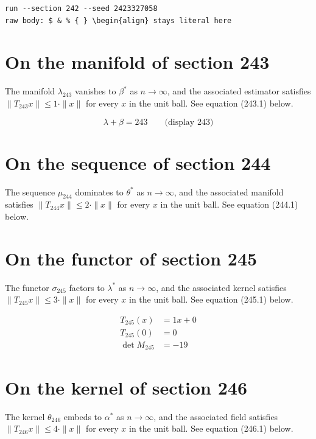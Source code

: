 \documentclass{article}
\begin{document}
\begin{verbatim}
run --section 242 --seed 2423327058
raw body: $ & % { } \begin{align} stays literal here
\end{verbatim}

\section{On the manifold of section 243}
The manifold $\lambda_{243}$ vanishes to $\beta^{*}$ as $n \to \infty$,
and the associated estimator satisfies $\|T_{243} x\| \leq 1 \cdot \|x\|$
for every $x$ in the unit ball. See equation (243.1) below.

$$
\lambda + \beta = 243 \qquad \text{(display 243)}
$$

\section{On the sequence of section 244}
The sequence $\mu_{244}$ dominates to $\theta^{*}$ as $n \to \infty$,
and the associated manifold satisfies $\|T_{244} x\| \leq 2 \cdot \|x\|$
for every $x$ in the unit ball. See equation (244.1) below.

\section{On the functor of section 245}
The functor $\sigma_{245}$ factors to $\lambda^{*}$ as $n \to \infty$,
and the associated kernel satisfies $\|T_{245} x\| \leq 3 \cdot \|x\|$
for every $x$ in the unit ball. See equation (245.1) below.

\begin{align}
T_{245}(x) &= 1 x + 0 \\
T_{245}(0) &= 0 \\
\det M_{245} &= -19
\end{align}

\section{On the kernel of section 246}
The kernel $\theta_{246}$ embeds to $\alpha^{*}$ as $n \to \infty$,
and the associated field satisfies $\|T_{246} x\| \leq 4 \cdot \|x\|$
for every $x$ in the unit ball. See equation (246.1) below.
\end{document}
